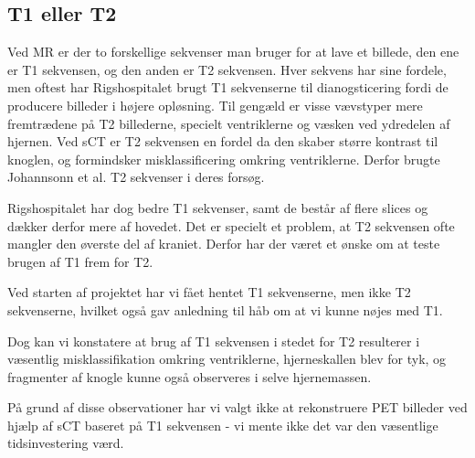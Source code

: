 \subsection{T1 eller T2}

Ved MR er der to forskellige sekvenser man bruger for at lave et billede, den ene er T1 sekvensen, og den anden er T2 sekvensen. Hver sekvens har sine fordele, men oftest har Rigshospitalet brugt T1 sekvenserne til dianogsticering fordi de producere billeder i højere opløsning. Til gengæld er visse vævstyper mere fremtrædene på T2 billederne, specielt ventriklerne og væsken ved ydredelen af hjernen. Ved sCT er T2 sekvensen en fordel da den skaber større kontrast til knoglen, og formindsker misklassificering omkring ventriklerne. Derfor brugte Johannsonn et al. T2 sekvenser i deres forsøg.

Rigshospitalet har dog bedre T1 sekvenser, samt de består af flere slices og dækker derfor mere af hovedet. Det er specielt et problem, at T2 sekvensen ofte mangler den øverste del af kraniet. Derfor har der været et ønske om at teste brugen af T1 frem for T2.

Ved starten af projektet har vi fået hentet T1 sekvenserne, men ikke T2 sekvenserne, hvilket også gav anledning til håb om at vi kunne nøjes med T1.

Dog kan vi konstatere at brug af T1 sekvensen i stedet for T2 resulterer i væsentlig misklassifikation omkring ventriklerne, hjerneskallen blev for tyk, og fragmenter af knogle kunne også observeres i selve hjernemassen. 

På grund af disse observationer har vi valgt ikke at rekonstruere PET billeder ved hjælp af sCT baseret på T1 sekvensen - vi mente ikke det var den væsentlige tidsinvestering værd.

